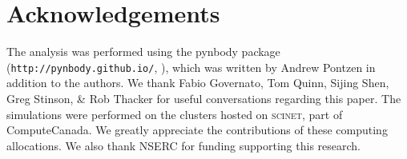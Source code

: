\section*{Acknowledgements}
The analysis was performed using the pynbody package
(\texttt{http://pynbody.github.io/}, \citep{pynbody}), which was written
by Andrew Pontzen in addition to the authors.  We thank Fabio Governato, Tom
Quinn, Sijing Shen, Greg Stinson, \& Rob Thacker for useful conversations
regarding this paper.  The simulations were performed on the clusters hosted on
\textsc{scinet}, part of ComputeCanada.  We greatly appreciate the contributions
of these computing allocations.  We also thank NSERC for funding supporting this
research.


